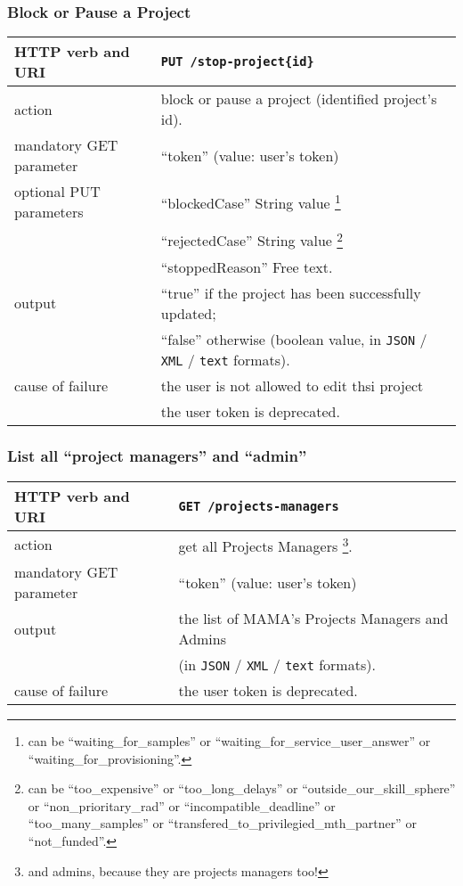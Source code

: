 \subsubsection{Block or Pause a Project}
\begin{tabular}{ | l | l | }
	\hline
	HTTP verb and URI & \texttt{PUT /stop-project\{id\}} \\
	\hline
	action & block or pause a project (identified \via project's id). \\
	\hline
	mandatory GET parameter & ``token'' (value: user's token) \\
	\hline
	optional PUT parameters & ``blockedCase'' String value \footnote{can be ``waiting\_for\_samples'' or ``waiting\_for\_service\_user\_answer'' or ``waiting\_for\_provisioning''.} \\		
	\space & ``rejectedCase'' String value \footnote{can be ``too\_expensive'' or ``too\_long\_delays'' or ``outside\_our\_skill\_sphere'' or ``non\_prioritary\_rad'' or ``incompatible\_deadline'' or ``too\_many\_samples'' or ``transfered\_to\_privilegied\_mth\_partner'' or ``not\_funded''.} \\
	\space & ``stoppedReason'' Free text. \\
	\hline
	output & ``true'' if the project has been successfully updated; \\
	\space & ``false'' otherwise (boolean value, in \texttt{JSON} / \texttt{XML} / \texttt{text} formats). \\
	\hline
	cause of failure &the user is not allowed to edit thsi project \\
	\space & the user token is deprecated. \\
	\hline
\end{tabular}
\newline

\subsubsection{List all ``project managers'' and ``admin''}
\begin{tabular}{ | l | l | }
	\hline
	HTTP verb and URI & \texttt{GET /projects-managers} \\
	\hline
	action & get all Projects Managers \footnote{and admins, because they are projects managers too!}. \\
	\hline
	mandatory GET parameter & ``token'' (value: user's token) \\
	\hline
	output & the list of MAMA's Projects Managers and Admins \\ 
	\space & (in \texttt{JSON} / \texttt{XML} / \texttt{text} formats). \\
	\hline
	cause of failure & the user token is deprecated. \\
	\hline
\end{tabular}
\newline

